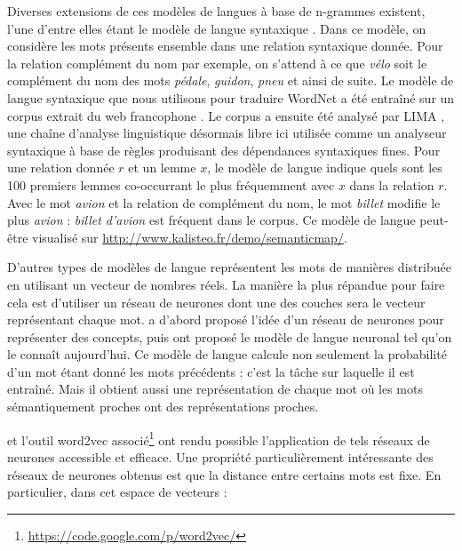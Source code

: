 Diverses extensions de ces modèles de langues à base de n-grammes existent,
l'une d'entre elles étant le modèle de langue syntaxique
\citep{lin1998automatic,goldberg2013dataset}. Dans ce modèle, on considère les
mots présents ensemble dans une relation syntaxique donnée. Pour la relation
complément du nom par exemple, on s'attend à ce que \emph{vélo} soit le
complément du nom des mots \emph{pédale}, \emph{guidon}, \emph{pneu} et ainsi
de suite. Le modèle de langue syntaxique que nous utilisons pour traduire
WordNet a été entraîné sur un corpus extrait du web francophone
\citep{grefenstette2007conquering}. Le corpus a ensuite été analysé par LIMA
\citep{besancon2010lima}, une chaîne d'analyse linguistique désormais libre ici
utilisée comme un analyseur syntaxique à base de règles produisant des
dépendances syntaxiques fines. Pour une relation donnée $r$ et un lemme $x$, le
modèle de langue indique quels sont les 100 premiers lemmes co-occurrant le
plus fréquemment avec $x$ dans la relation $r$.  Avec le mot \textit{avion} et
la relation de complément du nom, le mot \textit{billet} modifie le plus
\textit{avion} : \textit{billet d'avion} est fréquent dans le corpus. Ce modèle
de langue peut-être visualisé sur
\url{http://www.kalisteo.fr/demo/semanticmap/}.

D'autres types de modèles de langue représentent les mots de manières
distribuée en utilisant un vecteur de nombres réels. La manière la plus
répandue pour faire cela est d'utiliser un réseau de neurones dont une des
couches sera le vecteur représentant chaque mot. \cite{hinton1986learning} a
d'abord proposé l'idée d'un réseau de neurones pour représenter des concepts,
puis \cite{bengio2001neural,bengio2003neural} ont proposé le modèle de langue
neuronal tel qu'on le connaît aujourd'hui. Ce modèle de langue calcule non
seulement la probabilité d'un mot étant donné les mots précédents : c'est la
tâche sur laquelle il est entraîné. Mais il obtient aussi une représentation de
chaque mot où les mots sémantiquement proches ont des représentations proches.


\cite{mikolov2013efficient} et l'outil word2vec
associé\footnote{\url{https://code.google.com/p/word2vec/}} ont rendu possible
l'application de tels réseaux de neurones accessible et efficace. Une propriété
particulièrement intéressante des réseaux de neurones obtenus est que la
distance entre certains mots est fixe. En particulier, dans cet espace de
vecteurs :

